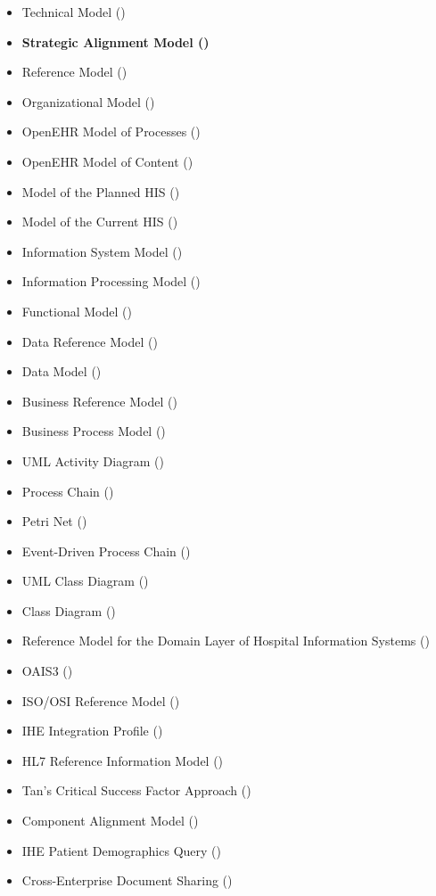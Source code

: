\begin{itemize}
  \item Technical Model ()
  \item \textbf{ Strategic Alignment Model ()}
  \item Reference Model ()
  \item Organizational Model ()
  \item OpenEHR Model of Processes ()
  \item OpenEHR Model of Content ()
  \item Model of the Planned HIS ()
  \item Model of the Current HIS ()
  \item Information System Model ()
  \item Information Processing Model ()
  \item Functional Model ()
  \item Data Reference Model ()
  \item Data Model ()
  \item Business Reference Model ()
  \item Business Process Model ()
  \item UML Activity Diagram ()
  \item Process Chain ()
  \item Petri Net ()
  \item Event-Driven Process Chain ()
  \item UML Class Diagram ()
  \item Class Diagram ()
  \item Reference Model for the Domain Layer of Hospital Information Systems ()
  \item OAIS3 ()
  \item ISO/OSI Reference Model ()
  \item IHE Integration Profile ()
  \item HL7 Reference Information Model ()
  \item Tan’s Critical Success Factor Approach ()
  \item Component Alignment Model ()
  \item IHE Patient Demographics Query ()
  \item Cross-Enterprise Document Sharing ()
\end{itemize}

